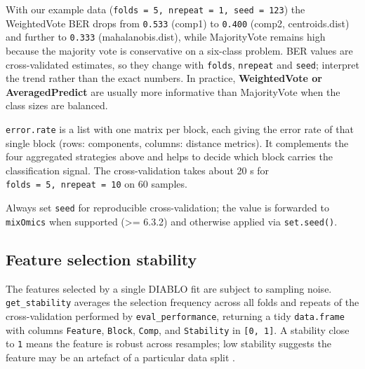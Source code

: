 \documentclass[
]{book}
\newenvironment{Shaded}{\begin{snugshade}}{\end{snugshade}}
\newcommand{\AttributeTok}[1]{\textcolor[rgb]{0.13,0.29,0.53}{#1}}
\newcommand{\CommentTok}[1]{\textcolor[rgb]{0.56,0.35,0.01}{\textit{#1}}}
\newcommand{\DecValTok}[1]{\textcolor[rgb]{0.00,0.00,0.81}{#1}}
\newcommand{\FloatTok}[1]{\textcolor[rgb]{0.00,0.00,0.81}{#1}}
\newcommand{\FunctionTok}[1]{\textcolor[rgb]{0.13,0.29,0.53}{\textbf{#1}}}
\newcommand{\NormalTok}[1]{#1}
\newcommand{\OtherTok}[1]{\textcolor[rgb]{0.56,0.35,0.01}{#1}}
\newcommand{\SpecialCharTok}[1]{\textcolor[rgb]{0.81,0.36,0.00}{\textbf{#1}}}
\begin{document}
With our example data (\texttt{folds\ =\ 5,\ nrepeat\ =\ 1,\ seed\ =\ 123}) the WeightedVote BER drops from \texttt{0.533} (comp1) to \texttt{0.400} (comp2, centroids.dist) and further to \texttt{0.333} (mahalanobis.dist), while MajorityVote remains high because the majority vote is conservative on a six-class problem.
BER values are cross-validated estimates, so they change with \texttt{folds}, \texttt{nrepeat} and \texttt{seed}; interpret the trend rather than the exact numbers.
In practice, \textbf{WeightedVote or AveragedPredict} are usually more informative than MajorityVote when the class sizes are balanced.

\texttt{error.rate} is a list with one matrix per block, each giving the error rate of that single block (rows: components, columns: distance metrics).
It complements the four aggregated strategies above and helps to decide which block carries the classification signal.
The cross-validation takes about 20 s for \texttt{folds\ =\ 5,\ nrepeat\ =\ 10} on 60 samples.

Always set \texttt{seed} for reproducible cross-validation; the value is forwarded to \texttt{mixOmics} when supported (\textgreater= 6.3.2) and otherwise applied via \texttt{set.seed()}.

\subsection{Feature selection stability}\label{feature-selection-stability}

The features selected by a single DIABLO fit are subject to sampling noise.
\texttt{get\_stability} averages the selection frequency across all folds and repeats of the cross-validation performed by \texttt{eval\_performance}, returning a tidy \texttt{data.frame} with columns \texttt{Feature}, \texttt{Block}, \texttt{Comp}, and \texttt{Stability} in \texttt{{[}0,\ 1{]}}.
A stability close to \texttt{1} means the feature is robust across resamples; low stability suggests the feature may be an artefact of a particular data split \citep{Liquet_stability_2012}.

\begin{Shaded}
\end{Shaded}
\end{document}

